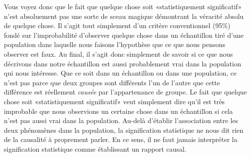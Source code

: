 \documentclass[
]{book}
\begin{document}
Vous voyez donc que le fait que quelque chose soit «statistiquement significatif» n'est absoluement pas une sorte de sceau magique démontrant la véracité absolu de quelque chose. Il s'agit tout simplement d'un critère conventionnel (95\%) fondé sur l'improbabilité d'observer quelque chose dans un échantillon tiré d'une population dans laquelle nous faisons l'hypothèse que ce que nous pensons observer est faux. Au final, il s'agit donc simplement de savoir si ce que nous décrivons dans notre échantillon est aussi probablement vrai dans la population qui nous intéresse. Que ce soit dans un échantillon ou dans une population, ce n'est pas parce que deux groupes sont différents l'un de l'autre que cette différence est réellement \emph{causée} par l'appartenance de groupe. Le fait que quelque chose soit «statistiquement significatif» veut simplement dire qu'il est très improbable que nous observions un certaine chose dans un échantillon si cela n'est pas aussi vrai dans la population. Au-delà d'établir l'association entre les deux phénomènes dans la population, la signification statistique ne nous dit rien de la causalité à proprement parler. En ce sens, il ne faut jamais interpréter la signification statistique comme établissant un rapport causal.

  
\end{document}
